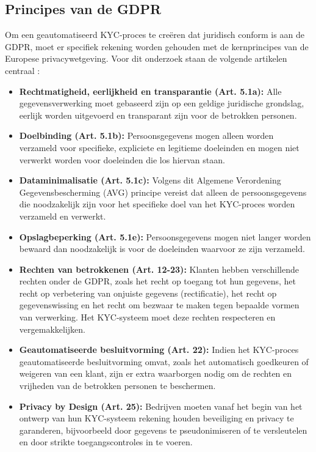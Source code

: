 \subsection{Principes van de GDPR}
Om een geautomatiseerd KYC-proces te creëren dat juridisch conform is aan de GDPR, 
moet er specifiek rekening worden gehouden met de kernprincipes van de Europese privacywetgeving. 
Voor dit onderzoek staan de volgende artikelen centraal
\autocite{EuropeanUnion2016}:
\begin{itemize}
    \item \textbf{Rechtmatigheid, eerlijkheid en transparantie (Art. 5.1a):} Alle gegevensverwerking moet gebaseerd zijn op een geldige juridische grondslag, eerlijk worden uitgevoerd en transparant zijn voor de betrokken personen.
    \item \textbf{Doelbinding (Art. 5.1b):} Persoonsgegevens mogen alleen worden verzameld voor specifieke, expliciete en legitieme doeleinden en mogen niet verwerkt worden voor doeleinden die los hiervan staan.
    \item \textbf{Dataminimalisatie (Art. 5.1c):} Volgens dit Algemene Verordening Gegevensbescherming (AVG) principe vereist dat alleen de persoonsgegevens die noodzakelijk zijn voor het specifieke doel van het KYC-proces worden verzameld en verwerkt.
    \item \textbf{Opslagbeperking (Art. 5.1e):} Persoonsgegevens mogen niet langer worden bewaard dan noodzakelijk is voor de doeleinden waarvoor ze zijn verzameld.
    \item \textbf{Rechten van betrokkenen (Art. 12-23):} Klanten hebben verschillende rechten onder de GDPR, zoals het recht op toegang tot hun gegevens, het recht op verbetering van onjuiste gegevens (rectificatie), het recht op gegevenswissing en het recht om bezwaar te maken tegen bepaalde vormen van verwerking. Het KYC-systeem moet deze rechten respecteren en vergemakkelijken.
    \item \textbf{Geautomatiseerde besluitvorming (Art. 22):} Indien het KYC-proces geautomatiseerde besluitvorming omvat, zoals het automatisch goedkeuren of weigeren van een klant, zijn er extra waarborgen nodig om de rechten en vrijheden van de betrokken personen te beschermen.
    \item \textbf{Privacy by Design (Art. 25):} Bedrijven moeten vanaf het begin van het ontwerp van hun KYC-systeem rekening houden beveiliging en privacy te garanderen, bijvoorbeeld door gegevens te pseudonimiseren of te versleutelen en door strikte toegangscontroles in te voeren.
\end{itemize}

